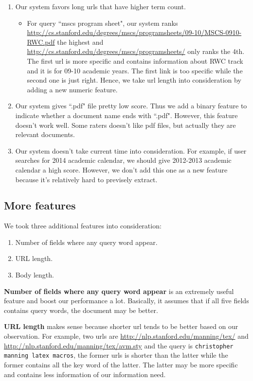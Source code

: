 \documentclass{article}
\begin{document}
\begin{enumerate}
  \item Our system favors long urls that have higher term count.
    \begin{itemize}
      \item For query ``mscs program sheet", our system ranks \url{http://cs.stanford.edu/degrees/mscs/programsheets/09-10/MSCS-0910-RWC.pdf} the highest and \url{http://cs.stanford.edu/degrees/mscs/programsheets/} only ranks the 4th. The first url is more specific and contains information about RWC track and it is for 09-10 academic years. The first link is too specific while the second one is just right. Hence, we take url length into consideration by adding a new numeric feature.
    \end{itemize}
  \item Our system gives ``.pdf" file pretty low score. Thus we add a binary feature to indicate whether a document name ends with ``.pdf". However, this feature doesn't work well. Some raters doesn't like pdf files, but actually they are relevant documents.
  \item Our system doesn't take current time into consideration. For example, if user searches for 2014 academic calendar, we should give 2012-2013 academic calendar a high score. However, we don't add this one as a new feature because it's relatively hard to previsely extract.
\end{enumerate}

\subsection{More features}

We took three additional features into consideration:

\begin{enumerate}
    \item Number of fields where any query word appear.
    \item URL length.
    \item Body length.
\end{enumerate}

\textbf{Number of fields where any query word appear} is an extremely useful feature and boost our performance a lot. Basically, it assumes that if all five fields contains query words, the document may be better.

\textbf{URL length} makes sense because shorter url tends to be better based on our observation. For example, two urls are \url{http://nlp.stanford.edu/manning/tex/} and \url{http://nlp.stanford.edu/manning/tex/avm.sty} and the query is \texttt{christopher manning latex macros}, the former urls is shorter than the latter while the former contains all the key word of the latter. The latter may be more specific and contains less information of our information need.
\end{document}
